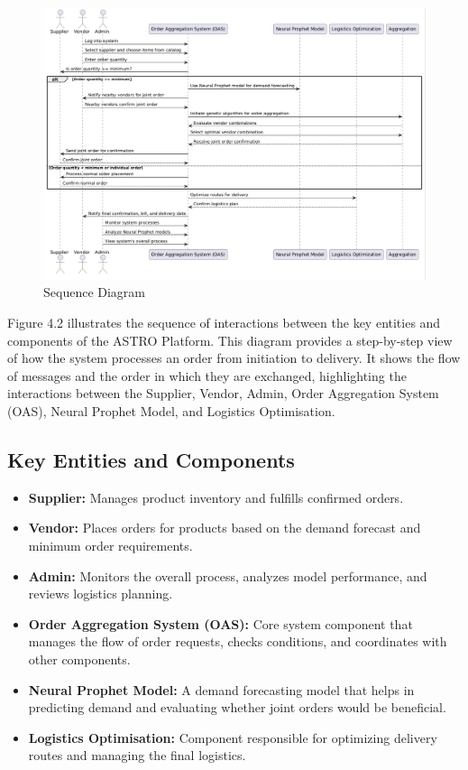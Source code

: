 \begin{figure}[H]
    \centering
    \includegraphics[width=1\textwidth]{Figures/Sequence Diagram.PNG}
    \caption{Sequence Diagram}
    \label{fig:sequence-diagram}
\end{figure}
\noindent Figure 4.2 illustrates the sequence of interactions between the key entities and components of the ASTRO Platform. This diagram provides a step-by-step view of how the system processes an order from initiation to delivery. It shows the flow of messages and the order in which they are exchanged, highlighting the interactions between the Supplier, Vendor, Admin, Order Aggregation System (OAS), Neural Prophet Model, and Logistics Optimisation.
\subsection{Key Entities and Components}
\begin{itemize}
    \item \textbf{Supplier:} Manages product inventory and fulfills confirmed orders.
    \item \textbf{Vendor:} Places orders for products based on the demand forecast and minimum order requirements.
    \item \textbf{Admin:} Monitors the overall process, analyzes model performance, and reviews logistics planning.
    \item \textbf{Order Aggregation System (OAS):} Core system component that manages the flow of order requests, checks conditions, and coordinates with other components.
    \item \textbf{Neural Prophet Model:} A demand forecasting model that helps in predicting demand and evaluating whether joint orders would be beneficial.
    \item \textbf{Logistics Optimisation:} Component responsible for optimizing delivery routes and managing the final logistics.
\end{itemize}
